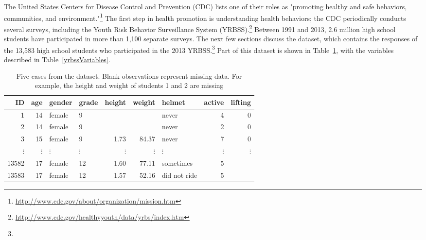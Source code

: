 \begin{spacing}{1.5}
The United States Centers for Disease Control and Prevention (CDC) lists one of their roles as "promoting healthy and safe behaviors, communities, and environment."\footnote{\url{http://www.cdc.gov/about/organization/mission.htm}} The first step in health promotion is understanding health behaviors; the CDC periodically conducts several surveys, including the Youth Risk Behavior Surveillance System (YRBSS).\footnote{\url{http://www.cdc.gov/healthyyouth/data/yrbs/index.htm}} Between 1991 and 2013, 2.6 million high school students have participated in more than 1,100 separate surveys. The next few sections discuss the  dataset, which contains the responses of the 13,583 high school students who participated in the 2013 YRBSS.\footnote{} Part of this dataset is shown in Table~\ref{yrbssDF}, with the variables described in Table~\ref{yrbssVariables}.

\begin{table}[h]
\centering
\begin{tabular}{rrllrrlrr}
  \hline
ID & age & gender & grade & height & weight & helmet & active & lifting \\ 
  \hline
1 &  14 & female & 9 &  &  & never &   4 &   0 \\ 
  2 &  14 & female & 9 &  &  & never &   2 &   0 \\ 
  3 &  15 & female & 9 & 1.73 & 84.37 & never &   7 &   0 \\ 
  $\vdots$ & $\vdots$ & $\vdots$ & $\vdots$ & $\vdots$ & $\vdots$ & $\vdots$ & $\vdots$ & $\vdots$ \\
  13582 &  17 & female & 12 & 1.60 & 77.11 & sometimes &   5 &  \\ 
  13583 &  17 & female & 12 & 1.57 & 52.16 & did not ride &   5 &  \\ 
  \hline
\end{tabular}
\caption{Five cases from the  dataset. Blank observations represent missing data. For example, the height and weight of students 1 and 2 are missing\textC{\vspace{-2mm}}}
\label{yrbssDF}
\end{table}


\end{spacing}
